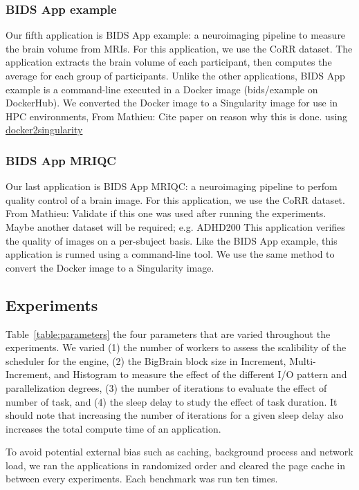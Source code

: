\documentclass[conference]{IEEEtran}
\newcommand{\MD}[1]{\color{magenta}From Mathieu: #1 \color{black}}
\begin{document}
	
\subsubsection{BIDS App example}
Our fifth application is BIDS App example: a neuroimaging pipeline to measure the brain volume from MRIs.
For this application, we use the CoRR dataset.
The application extracts the brain volume of each participant, then computes the average for each group of participants.
Unlike the other applications, BIDS App example is a command-line executed in a Docker image (bids/example on DockerHub).
We converted the Docker image to a Singularity image for use in HPC environments, \MD{Cite paper on reason why this is done.}
using \href{https://hub.docker.com/r/singularityware/docker2singularity/tags/}{docker2singularity}

\subsubsection{BIDS App MRIQC}
Our last application is BIDS App MRIQC: a neuroimaging pipeline to perfom quality control of a brain image.
For this application, we use the CoRR dataset. \MD{Validate if this one was used after running the experiments. Maybe another dataset will be required; e.g. ADHD200}
This application verifies the quality of images on a per-sbuject basis.
Like the BIDS App example, this application is runned using a command-line tool.
We use the same method to convert the Docker image to a Singularity image.
	
\subsection{Experiments}
Table~\ref{table:parameters} the four parameters that are varied throughout the experiments.
We varied (1) the number of workers to assess the scalibility of the scheduler for the engine,
(2) the BigBrain block size in Increment, Multi-Increment, and Histogram to measure the effect of the different I/O pattern and parallelization degrees,
(3) the number of iterations to evaluate the effect of number of task,
and (4) the sleep delay to study the effect of task duration.
It should note that increasing the number of iterations for a given sleep delay also increases the total compute time of an application.

To avoid potential external bias such as caching, background process and network load, we ran the applications in randomized order and cleared the page cache in between every experiments.
Each benchmark was run ten times.
\end{document}
